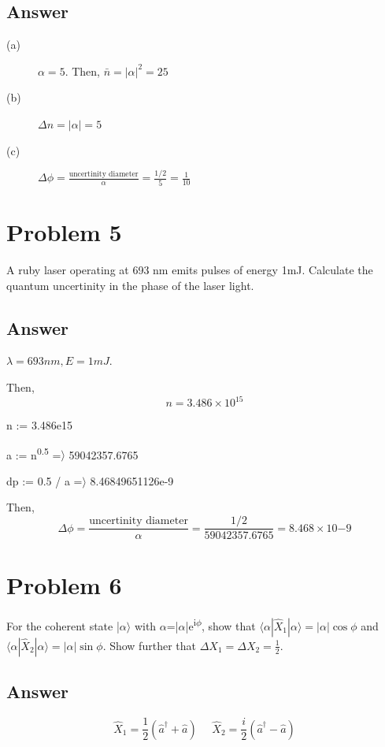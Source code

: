 \documentclass[a4paper,11pt]{article}
\begin{document}
\subsection*{Answer}
\label{sec:org6415c01}
\begin{description}
\item[{(a)}] \(\alpha = 5\). Then, \(\bar{n} = |\alpha|^2 = 25\)

\item[{(b)}] \(\Delta n = |\alpha| = 5\)

\item[{(c)}] \(\Delta \phi = \frac{\text{uncertinity diameter}}{\alpha} = \frac{1/2}{5} = \frac{1}{10}\)
\end{description}
\section*{Problem 5}
\label{sec:org44d27ad}
A ruby laser operating at 693 nm emits pulses of energy 1mJ. Calculate the quantum uncertinity in the phase of the laser light.

\subsection*{Answer}
\label{sec:org26cdd62}

\(\lambda = 693nm, E=1mJ\).

Then, $$n = 3.486\times 10^{15}$$

n := 3.486e15

a := n\textsuperscript{0.5} =\(\rangle\)  59042357.6765

dp := 0.5 / a =\(\rangle\)  8.46849651126e-9

Then, $$\Delta \phi = \frac{\text{uncertinity diameter}}{\alpha}=\frac{1/2}{59042357.6765} = 8.468\times 10{-9}$$
\section*{Problem 6}
\label{sec:org4acf728}
For the coherent state |\(\alpha \rangle\)  with \(\alpha\)=|\(\alpha\)|e\textsuperscript{i\(\phi\)}, show that \(\langle \alpha|\hat{X}_1|\alpha\rangle =|\alpha|\cos\phi\) and \(\langle \alpha|\hat{X}_2|\alpha\rangle =|\alpha|\sin\phi\). Show further that \(\Delta X_1 = \Delta X_2 = \frac{1}{2}\).

\subsection*{Answer}
\label{sec:org737bc0c}
$$\hat{X}_1 = \frac{1}{2} (\hat{a}^\dag+\hat{a})~~~~~~\hat{X}_2 = \frac{i}{2} (\hat{a}^\dag-\hat{a})$$
\end{document}
